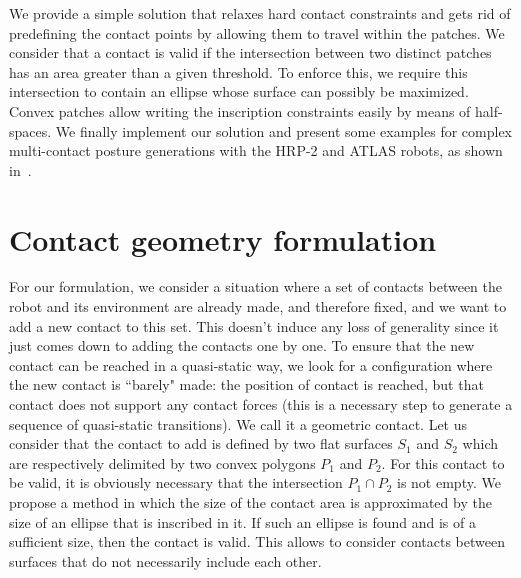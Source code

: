 We provide a simple solution that relaxes hard contact constraints and gets rid of predefining the contact points by allowing them to travel within the patches. We consider that a contact is valid if the intersection between two distinct patches has an area greater than a given threshold. To enforce this, we require this intersection to contain an ellipse whose surface can possibly be maximized. Convex patches allow writing the inscription constraints easily by means of half-spaces. We finally implement our solution and present some examples for complex multi-contact posture generations with the HRP-2 and ATLAS robots, as shown in~. 


\section{Contact geometry formulation}
\label{sec:background}

For our formulation, we consider a situation where a set of contacts between the robot and its environment are already made, and therefore fixed, and we want to add a new contact to this set. This doesn't induce any loss of generality since it just comes down to adding the contacts one by one.
To ensure that the new contact can be reached in a quasi-static way, we look for a configuration where the new contact is ``barely" made: the position of contact is reached, but that contact does not support any contact forces (this is a necessary step to generate a sequence of quasi-static transitions). We call it a geometric contact. Let us consider that the contact to add is defined by two flat surfaces $S_1$ and $S_2$ which are respectively delimited by two convex polygons $P_1$ and $P_2$. For this contact to be valid, it is obviously necessary that the intersection $P_1 \cap P_2$ is not empty. We propose a method in which the size of the contact area is approximated by the size of an ellipse that is inscribed in it. If such an ellipse is found and is of a sufficient size, then the contact is valid. This allows to consider contacts between surfaces that do not necessarily include each other.

